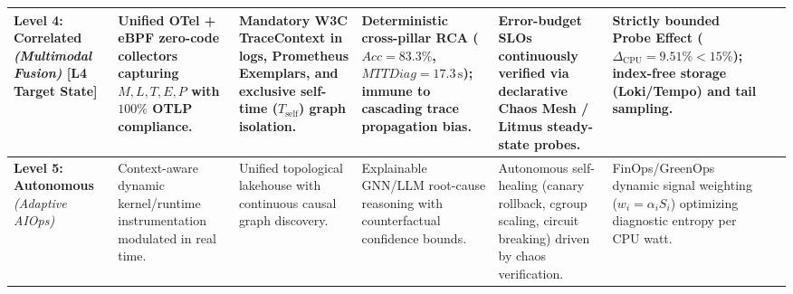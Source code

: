 \begin{table}[t]
\begin{tabularx}{\textwidth}{l >{\raggedright\arraybackslash}X >{\raggedright\arraybackslash}X >{\raggedright\arraybackslash}X >{\raggedright\arraybackslash}X >{\raggedright\arraybackslash}X p{2.1cm}}
\midrule
\textbf{Level 4: Correlated} \newline \textit{(Multimodal Fusion)} \newline \textbf{[L4 Target State]} & Unified OTel + eBPF zero-code collectors capturing $M, L, T, E, P$ with $100\%$ OTLP compliance. & Mandatory W3C TraceContext in logs, Prometheus Exemplars, and exclusive self-time ($T_{\text{self}}$) graph isolation. & Deterministic cross-pillar RCA ($Acc = 83.3\%$, $MTTDiag = 17.3\,\text{s}$); immune to cascading trace propagation bias. & Error-budget SLOs continuously verified via declarative Chaos Mesh / Litmus steady-state probes. & Strictly bounded Probe Effect ($\Delta_{\text{CPU}} = 9.51\% < 15\%$); index-free storage (Loki/Tempo) and tail sampling. &~\cite{faseeha_2025, gomes_2025, hartikainen_2024, kosinska_2023} \\
\midrule
\textbf{Level 5: Autonomous} \newline \textit{(Adaptive AIOps)} & Context-aware dynamic kernel/runtime instrumentation modulated in real time. & Unified topological lakehouse with continuous causal graph discovery. & Explainable GNN/LLM root-cause reasoning with counterfactual confidence bounds. & Autonomous self-healing (canary rollback, cgroup scaling, circuit breaking) driven by chaos verification. & FinOps/GreenOps dynamic signal weighting ($w_i = \alpha_i S_i$) optimizing diagnostic entropy per CPU watt. &~\cite{deng_2024, gomes_2025, han_2024, amgothu_2025} \\
\bottomrule
\end{tabularx}
\end{table}
